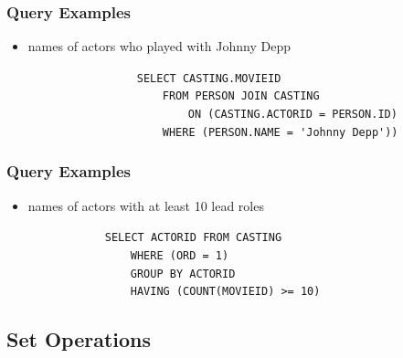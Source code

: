 \documentclass[dvipsnames]{beamer}
\theoremstyle{plain}
\begin{document}
\begin{frame}[fragile]
  \frametitle{Query Examples}

  \begin{itemize}
    \item names of actors who played with Johnny Depp

    \medskip
{}
~~~~~~~~~~~~~~~~~\lstinline!SELECT CASTING.MOVIEID!\\
~~~~~~~~~~~~~~~~~~~~~\lstinline!FROM PERSON JOIN CASTING!\\
~~~~~~~~~~~~~~~~~~~~~~~~~\lstinline!ON (CASTING.ACTORID = PERSON.ID)!\\
~~~~~~~~~~~~~~~~~~~~~\lstinline!WHERE (PERSON.NAME = 'Johnny Depp'))!\\
  \end{itemize}
\end{frame}

\begin{frame}[fragile]
  \frametitle{Query Examples}

  \begin{itemize}
    \item names of actors with at least 10 lead roles

    \medskip
{}
~~~~~~~~~~~~\lstinline!SELECT ACTORID FROM CASTING!\\
~~~~~~~~~~~~~~~~\lstinline!WHERE (ORD = 1)!\\
\pause
~~~~~~~~~~~~~~~~\lstinline!GROUP BY ACTORID!\\
\pause
~~~~~~~~~~~~~~~~\lstinline!HAVING (COUNT(MOVIEID) >= 10)!\\
  \end{itemize}
\end{frame}

\subsection{Set Operations}
\end{document}
